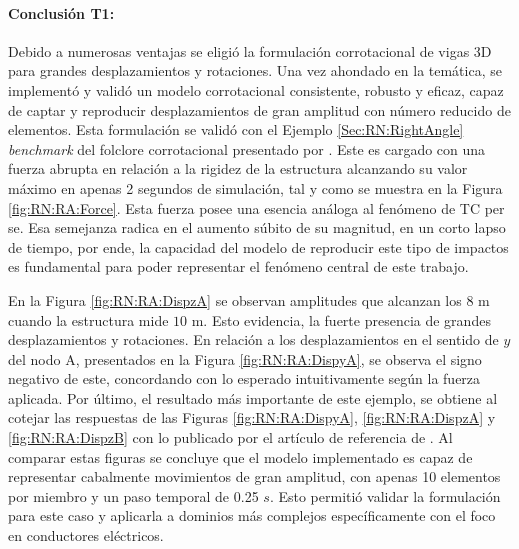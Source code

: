 \paragraph*{Conclusión T1:}
Debido a numerosas ventajas se eligió la formulación corrotacional de vigas 3D para grandes desplazamientos y rotaciones. Una vez ahondado en la temática, se implementó y validó un modelo corrotacional consistente, robusto y eficaz, capaz de captar y reproducir desplazamientos de gran amplitud con número reducido de elementos. Esta formulación se validó con el Ejemplo \ref{Sec:RN:RightAngle} \emph{benchmark} del folclore corrotacional presentado por \cite{simo1988dynamics}. Este es cargado con una fuerza abrupta en relación a la rigidez de la estructura alcanzando su valor máximo en apenas 2 segundos de simulación, tal y como se muestra en la Figura \ref{fig:RN:RA:Force}. Esta fuerza posee una esencia análoga al fenómeno de TC per se. Esa semejanza radica en el aumento súbito de su magnitud, en un corto lapso de tiempo, por ende, la capacidad del modelo de reproducir este tipo de impactos es fundamental para poder representar el fenómeno central de este trabajo.

En la Figura \ref{fig:RN:RA:DispzA} se observan amplitudes que alcanzan los $8$ m cuando la estructura mide $10$ m. Esto evidencia, la fuerte presencia de grandes desplazamientos y rotaciones.  En relación a los desplazamientos en el sentido de $y$ del nodo A, presentados en la Figura \ref{fig:RN:RA:DispyA}, se observa el signo negativo de este, concordando con lo esperado intuitivamente según la fuerza aplicada. Por último, el resultado más importante de este ejemplo, se obtiene al cotejar las respuestas de las Figuras \ref{fig:RN:RA:DispyA}, \ref{fig:RN:RA:DispzA} y \ref{fig:RN:RA:DispzB} con lo publicado por el artículo de referencia de \cite{Le2014}. Al comparar estas figuras se concluye que el modelo implementado es capaz de representar cabalmente movimientos de gran amplitud, con apenas 10 elementos por miembro y un paso temporal de 0.25 $s$. Esto permitió validar la formulación para este caso y aplicarla a dominios más complejos específicamente con el foco en conductores eléctricos. 

